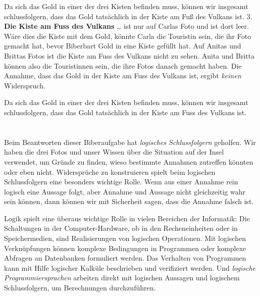 {{Da sich das Gold in einer der drei Kisten befinden muss, können wir insgesamt schlussfolgern, dass das Gold tatsächlich in der Kiste am Fuß des Vulkans ist.
$3$. \textbf{Die Kiste am Fuss des Vulkans}
… ist nur auf Carlas Foto und ist dort leer. Wäre dies die Kiste mit dem Gold, könnte Carla die Touristin sein, die ihr Foto gemacht hat, bevor Biberbart Gold in eine Kiste gefüllt hat. Auf Anitas und Brittas Fotos ist die Kiste am Fuss des Vulkans nicht zu sehen.  Anita und Britta können also die Touristinnen sein, die ihre Fotos danach gemacht haben.  Die Annahme, dass das Gold in der Kiste am Fuss des Vulkans ist, ergibt \emph{keinen} Widerspruch.

Da sich das Gold in einer der drei Kisten befinden muss, können wir insgesamt schlussfolgern, dass das Gold tatsächlich in der Kiste am Fuss des Vulkans ist.



\section*{\BrochureItsInformatics}
Beim Beantworten dieser Biberaufgabe hat \emph{logisches Schlussfolgern} geholfen.
Wir haben die drei Fotos und unser Wissen über die Situation auf der Insel verwendet, um Gründe zu finden, wieso bestimmte Annahmen zutreffen könnten oder eben nicht.
Widersprüche zu konstruieren spielt beim logischen Schlussfolgern eine besonders wichtige Rolle.
Wenn aus einer Annahme rein logisch eine Aussage folgt, aber Annahme und Aussage nicht gleichzeitig wahr sein können, dann können wir mit Sicherheit sagen, dass die Annahme falsch ist.

Logik spielt eine überaus wichtige Rolle in vielen Bereichen der Informatik: Die Schaltungen in der Computer-Hardware, ob in den Recheneinheiten oder in Speichermedien, sind Realisierungen von logischen Operationen.  Mit logischen Verknüpfungen können komplexe Bedingungen in Programmen oder komplexe Abfragen an Datenbanken formuliert werden.  Das Verhalten von Programmen kann mit Hilfe logischer Kalküle beschrieben und verifiziert werden.  Und \emph{logische Programmiersprachen} arbeiten direkt mit logischen Aussagen und logischem Schlussfolgern, um Berechnungen durchzuführen.



}}
